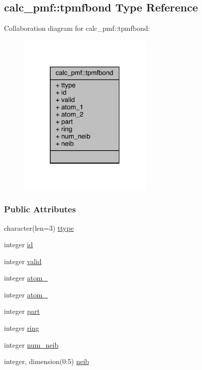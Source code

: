 \hypertarget{structcalc__pmf_1_1tpmfbond}{\subsection{calc\-\_\-pmf\-:\-:tpmfbond Type Reference}
\label{structcalc__pmf_1_1tpmfbond}
}


Collaboration diagram for calc\-\_\-pmf\-:\-:tpmfbond\-:
\nopagebreak
\begin{figure}[H]
\begin{center}
\leavevmode
\includegraphics[width=184pt]{structcalc__pmf_1_1tpmfbond__coll__graph}
\end{center}
\end{figure}
\subsubsection*{Public Attributes}
\begin{DoxyCompactItemize}
\item 
character(len=3) \hyperlink{structcalc__pmf_1_1tpmfbond_a733ecbca55bdcb850264eefbff30e12c}{ttype}
\item 
integer \hyperlink{structcalc__pmf_1_1tpmfbond_a3046e41b5febad41a413b6279c84b63e}{id}
\item 
integer \hyperlink{structcalc__pmf_1_1tpmfbond_abf0e0b1c749fefd233a8b7048dad0243}{valid}
\item 
integer \hyperlink{structcalc__pmf_1_1tpmfbond_a8868d3338a4906150f063d44edc09a40}{atom\-\_}
\item 
integer \hyperlink{structcalc__pmf_1_1tpmfbond_a38a1cb34c193e9ac7d4db82eb6d3c219}{atom\-\_}
\item 
integer \hyperlink{structcalc__pmf_1_1tpmfbond_aede239db2a36d760cb24f4eee98b9934}{part}
\item 
integer \hyperlink{structcalc__pmf_1_1tpmfbond_ac196423ed7ba0cb89992623f347447b3}{ring}
\item 
integer \hyperlink{structcalc__pmf_1_1tpmfbond_aaeb2d27ab41da85dff7ba86cda422cb8}{num\-\_\-neib}
\item 
integer, dimension(0\-:5) \hyperlink{structcalc__pmf_1_1tpmfbond_a0e02380059096d336250ed8d974f1b13}{neib}
\end{DoxyCompactItemize}


